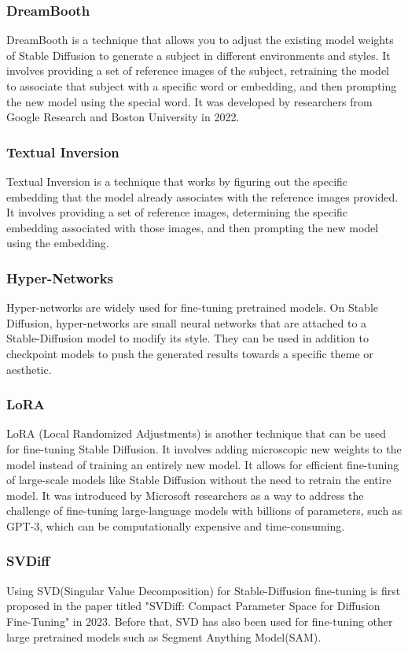 \documentclass[conference]{IEEEtran}
\begin{document}
\subsubsection{DreamBooth}
DreamBooth is a technique that allows you to adjust the existing model weights of Stable Diffusion to generate a subject in different environments and styles. It involves providing a set of reference images of the subject, retraining the model to associate that subject with a specific word or embedding, and then prompting the new model using the special word. It was developed by researchers from Google Research and Boston University in 2022.

\subsubsection{Textual Inversion} 
Textual Inversion is a technique that works by figuring out the specific embedding that the model already associates with the reference images provided. It involves providing a set of reference images, determining the specific embedding associated with those images, and then prompting the new model using the embedding.

\subsubsection{Hyper-Networks}
Hyper-networks are widely used for fine-tuning pretrained models. On Stable Diffusion, hyper-networks are small neural networks that are attached to a Stable-Diffusion model to modify its style. They can be used in addition to checkpoint models to push the generated results towards a specific theme or aesthetic.

\subsubsection{LoRA}
LoRA (Local Randomized Adjustments) is another technique that can be used for fine-tuning Stable Diffusion. It involves adding microscopic new weights to the model instead of training an entirely new model. It allows for efficient fine-tuning of large-scale models like Stable Diffusion without the need to retrain the entire model. It was introduced by Microsoft researchers as a way to address the challenge of fine-tuning large-language models with billions of parameters, such as GPT-3, which can be computationally expensive and time-consuming.

\subsubsection{SVDiff}
Using SVD(Singular Value Decomposition) for Stable-Diffusion fine-tuning is first proposed in the paper titled "SVDiff: Compact Parameter Space for Diffusion Fine-Tuning" in 2023.\cite{svd} Before that, SVD
has also been used for fine-tuning other large pretrained models such as Segment Anything Model(SAM).
\end{document}
